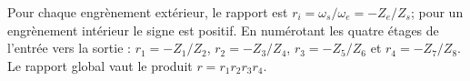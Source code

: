 \begin{corrigebox}
Pour chaque engrènement extérieur, le rapport est
            $r_i=\omega_{s}/\omega_{e}=-Z_e/Z_s$; pour un engrènement intérieur le signe
            est positif. En numérotant les quatre étages de l'entrée vers la sortie :
            $r_1=-Z_1/Z_2$, $r_2=-Z_3/Z_4$, $r_3=-Z_5/Z_6$ et $r_4=-Z_7/Z_8$.
            Le rapport global vaut le produit $r=r_1r_2r_3r_4$.
\end{corrigebox}
